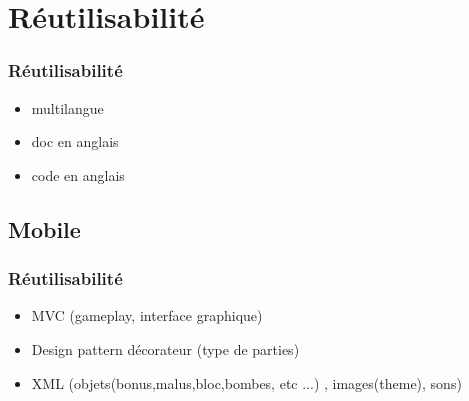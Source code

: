 \section{Réutilisabilité}

	\begin{frame}
	\frametitle{Réutilisabilité}
	
		\begin{itemize}
			\item multilangue
			\item doc en anglais
			\item code en anglais
		\end{itemize}
	
	\end{frame}

\subsection{Mobile}

	\begin{frame}
	\frametitle{Réutilisabilité}
	
		\begin{itemize}
			\item MVC (gameplay, interface graphique)
			\item Design pattern décorateur (type de parties)
			\item XML (objets(bonus,malus,bloc,bombes, etc ...) , images(theme), sons)
		\end{itemize}
	
	\end{frame}

